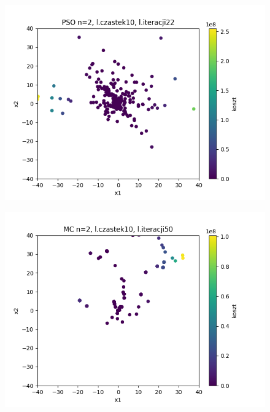 \documentclass[11pt, a4paper, oneside]{article}
\begin{document}
\begin{figure}[H]
\centering
\begin{minipage}[b]{\dimexpr.5\textwidth-1em}
  \centering
  \includegraphics[width=1\linewidth]{grafiki/Wykresy2d/PSO_Zad2_scatter_allIters.png}
  \label{fig:położeniaWszystkich:PSO2}
\end{minipage} \hfill
\begin{minipage}[b]{\dimexpr.5\textwidth-1em}
  \centering
  \includegraphics[width=1\linewidth]{grafiki/Wykresy2d/MC_Zad2_scatter_allIters.png}
  \label{fig:położeniaWszystkich:MC2}
\end{minipage}
\end{figure}
\end{document}

